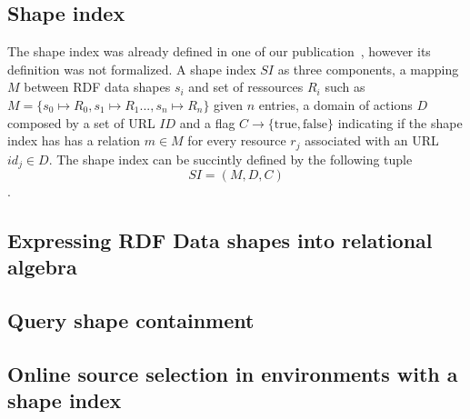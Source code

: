 \subsection{Shape index}
The shape index was already defined in one of our publication~\cite{tam2024opportunitiesshapebasedoptimizationlink}, however its definition was not formalized.
A shape index $SI$ as three components, a mapping $M$ between RDF data shapes $s_i$ and set of ressources $R_i$ such as $M = \{s_0 \mapsto R_0, s_1 \mapsto R_1..., s_n \mapsto R_n\}$ given $n$ entries,
a domain of actions $D$ composed by a set of URL $ID$ and
a flag $C\rightarrow \{\mathrm{true}, \mathrm{false}\}$ indicating if the shape index has has a relation $m \in M$ for every resource $r_j$ associated with an URL $id_j \in D$. 
The shape index can be succintly defined by the following tuple 
\begin{equation}
SI = (M, D, C)
\end{equation}.

\subsection{Expressing RDF Data shapes into relational algebra}

\subsection{Query shape containment}

\subsection{Online source selection in environments with a shape index}